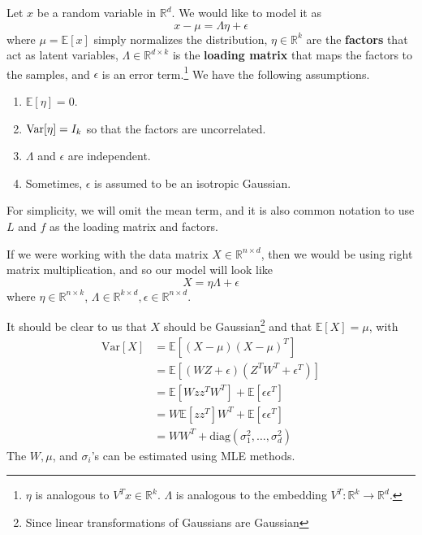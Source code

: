   \begin{definition} 
    Let $x$ be a random variable in $\mathbb{R}^d$. We would like to model it as 
    \begin{equation}
      x - \mu = \Lambda \eta + \epsilon
    \end{equation}
    where $\mu = \mathbb{E}[x]$ simply normalizes the distribution, $\eta \in \mathbb{R}^k$ are the \textbf{factors} that act as latent variables, $\Lambda \in \mathbb{R}^{d \times k}$ is the \textbf{loading matrix} that maps the factors to the samples, and $\epsilon$ is an error term.\footnote{$\eta$ is analogous to $V^T x \in \mathbb{R}^k$. $\Lambda$ is analogous to the embedding $V^T: \mathbb{R}^k \to \mathbb{R}^d$.} We have the following assumptions. 
    \begin{enumerate}
      \item $\mathbb{E}[\eta] = 0$. 
      \item $\operatorname{Var}[\eta] = I_k$ so that the factors are uncorrelated. 
      \item $\Lambda$ and $\epsilon$ are independent. 
      \item Sometimes, $\epsilon$ is assumed to be an isotropic Gaussian. 
    \end{enumerate}
  \end{definition} 

  For simplicity, we will omit the mean term, and it is also common notation to use $L$ and $f$ as the loading matrix and factors. 

  If we were working with the data matrix $X \in \mathbb{R}^{n \times d}$, then we would be using right matrix multiplication, and so our model will look like 
  \begin{equation}
    X = \eta \Lambda + \epsilon
  \end{equation}
  where $\eta \in \mathbb{R}^{n \times k}$, $\Lambda \in \mathbb{R}^{k \times d}, \epsilon \in \mathbb{R}^{n \times d}$. 

  \begin{theorem}[Likelihood]
    
  \end{theorem}

  \begin{lemma} 
    It should be clear to us that $X$ should be Gaussian\footnote{Since linear transformations of Gaussians are Gaussian} and that $\mathbb{E}[X] = \mu$, with 
    \begin{align} 
        \mathrm{Var}[X] & = \mathbb{E}[ (X - \mu)(X - \mu)^T ] \\
                        & = \mathbb{E}[ (W Z + \epsilon) (Z^T W^T + \epsilon^T)] \\
                        & = \mathbb{E}[W z z^T W^T] + \mathbb{E}[ \epsilon \epsilon^T] \\
                        & = W \mathbb{E}[ z z^T] W^T + \mathbb{E}[ \epsilon \epsilon^T] \\
                        & = W W^T + \mathrm{diag}(\sigma_1^2, \ldots, \sigma_d^2) 
    \end{align} 
    The $W, \mu$, and $\sigma_i$'s can be estimated using MLE methods. 
  \end{lemma}

